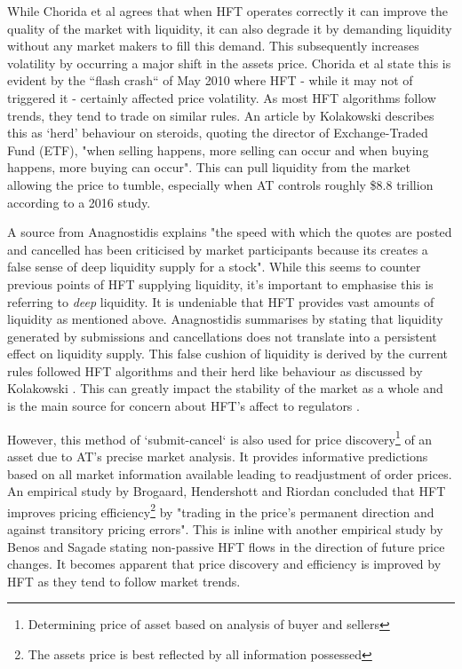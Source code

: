While Chorida et al \cite{REPORT:ChordiaEtAl:2013} agrees that when HFT operates correctly it can improve the quality of the market with liquidity, it can also degrade it by demanding liquidity without any market makers to fill this demand. This subsequently increases volatility by occurring a major shift in the assets price. Chorida et al state this is evident by the ``flash crash`` of May 2010 where HFT - while it may not of triggered it - certainly affected price volatility. As most HFT algorithms follow trends, they tend to trade on similar rules. An article by Kolakowski \cite{ART:Kolakowski:2018} describes this as `herd' behaviour on steroids, quoting the director of Exchange-Traded Fund (ETF), "when selling happens, more selling can occur and when buying happens, more buying can occur". This can pull liquidity from the market allowing the price to tumble, especially when AT controls roughly \$8.8 trillion according to a 2016 study\cite{ART:Kolakowski:2018}. 

A source from Anagnostidis \cite{UNPUB:Anagnostidis:2017} explains "the speed with which the quotes are posted and cancelled has been criticised by market participants because its creates a false sense of deep liquidity supply for a stock". While this seems to counter previous points of HFT supplying liquidity, it's important to emphasise this is referring to \textit{deep} liquidity. It is undeniable that HFT provides vast amounts of liquidity as mentioned above. Anagnostidis summarises by stating that liquidity generated by submissions and cancellations does not translate into a persistent effect on liquidity supply. This false cushion of liquidity is derived by the current rules followed HFT algorithms and their herd like behaviour as discussed by Kolakowski \cite{ART:Kolakowski:2018}. This can greatly impact the stability of the market as a whole and is the main source for concern about HFT's affect to regulators \cite{WEB:Kaufman:2016}.   

However, this method of `submit-cancel` is also used for price discovery\footnote{Determining price of asset based on analysis of buyer and sellers} of an asset due to AT's precise market analysis. It provides informative predictions based on all market information available leading to readjustment of order prices. An empirical study by Brogaard, Hendershott and Riordan \cite{UNPUB:Brogaard:2017} concluded that HFT improves pricing efficiency\footnote{The assets price is best reflected by all information possessed} by "trading in the price's permanent direction and against transitory pricing errors". This is inline with another empirical study by Benos and Sagade \cite{ART:BENOS:2016} stating non-passive HFT flows in the direction of future price changes. It becomes apparent that price discovery and efficiency is improved by HFT as they tend to follow market trends.  

